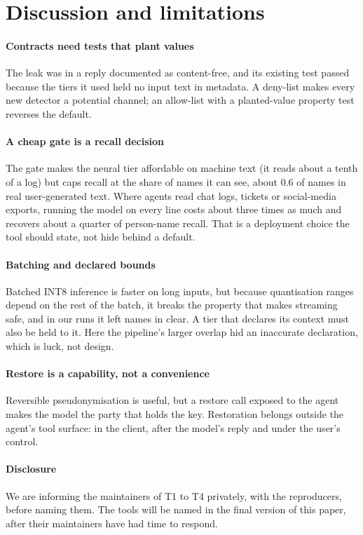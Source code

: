 \section{Discussion and limitations}\label{sec:discussion}

\paragraph{Contracts need tests that plant values} The leak was in a reply documented as content-free, and its existing test passed because the tiers it used held no input text in metadata. A deny-list makes every new detector a potential channel; an allow-list with a planted-value property test reverses the default.

\paragraph{A cheap gate is a recall decision} The gate makes the neural tier affordable on machine text (it reads about a tenth of a log) but caps recall at the share of names it can see, about 0.6 of names in real user-generated text. Where agents read chat logs, tickets or social-media exports, running the model on every line costs about three times as much and recovers about a quarter of person-name recall. That is a deployment choice the tool should state, not hide behind a default.

\paragraph{Batching and declared bounds} Batched INT8 inference is faster on long inputs, but because quantisation ranges depend on the rest of the batch, it breaks the property that makes streaming safe, and in our runs it left names in clear. A tier that declares its context must also be held to it. Here the pipeline's larger overlap hid an inaccurate declaration, which is luck, not design.

\paragraph{Restore is a capability, not a convenience} Reversible pseudonymisation is useful, but a restore call exposed to the agent makes the model the party that holds the key. Restoration belongs outside the agent's tool surface: in the client, after the model's reply and under the user's control.

\paragraph{Disclosure} We are informing the maintainers of T1 to T4 privately, with the reproducers, before naming them. The tools will be named in the final version of this paper, after their maintainers have had time to respond.

